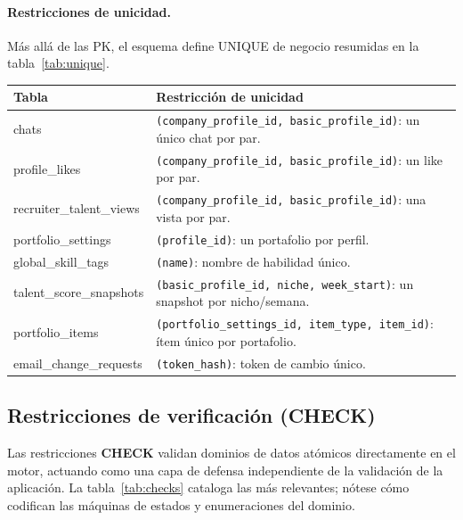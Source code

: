 \paragraph{Restricciones de unicidad.} Más allá de las PK, el esquema define UNIQUE de
negocio resumidas en la tabla~\ref{tab:unique}.

\vspace{0.2cm}
\noindent
\renewcommand{\arraystretch}{1.3}
\fontsize{8.5}{10.2}\selectfont\sffamily
\begin{tabularx}{\textwidth}{|>{\ttfamily\color{colorPrimario}}l|X|}
\hline
\rowcolor{headerTabla}
\sffamily\textbf{Tabla} & \sffamily\textbf{Restricción de unicidad} \\
\hline
chats & \texttt{(company\_profile\_id, basic\_profile\_id)}: un único chat por par. \\
\hline
\rowcolor{grisTecnico}
profile\_likes & \texttt{(company\_profile\_id, basic\_profile\_id)}: un like por par. \\
\hline
recruiter\_talent\_views & \texttt{(company\_profile\_id, basic\_profile\_id)}: una vista por par. \\
\hline
\rowcolor{grisTecnico}
portfolio\_settings & \texttt{(profile\_id)}: un portafolio por perfil. \\
\hline
global\_skill\_tags & \texttt{(name)}: nombre de habilidad único. \\
\hline
\rowcolor{grisTecnico}
talent\_score\_snapshots & \texttt{(basic\_profile\_id, niche, week\_start)}: un snapshot por nicho/semana. \\
\hline
portfolio\_items & \texttt{(portfolio\_settings\_id, item\_type, item\_id)}: ítem único por portafolio. \\
\hline
\rowcolor{grisTecnico}
email\_change\_requests & \texttt{(token\_hash)}: token de cambio único. \\
\hline
\end{tabularx}
\label{tab:unique}

\subsection{Restricciones de verificación (CHECK)}
\label{subsec:check}

Las restricciones \textbf{CHECK} validan dominios de datos atómicos directamente en el
motor, actuando como una capa de defensa independiente de la validación de la
aplicación. La tabla~\ref{tab:checks} cataloga las más relevantes; nótese cómo
codifican las máquinas de estados y enumeraciones del dominio.

